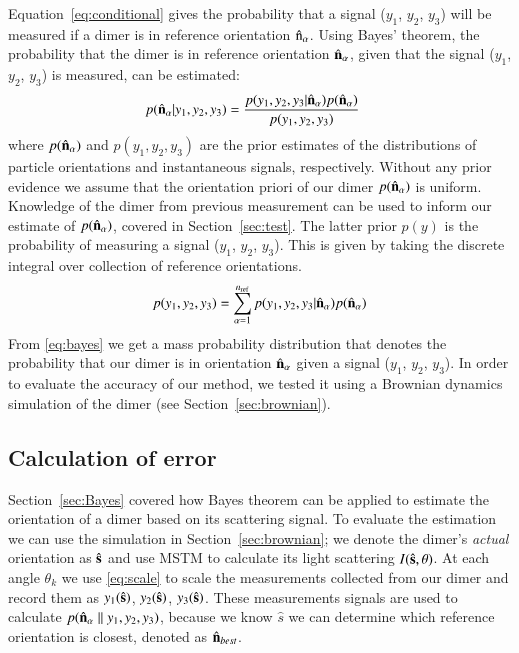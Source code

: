 \documentclass[final, 3p]{elsarticle}
\begin{document}
Equation~\eqref{eq:conditional} gives the probability that a signal
($y_1$, $y_2$, $y_3$) will be measured if a dimer is in reference
orientation $\hat{\rm n}_\alpha$.
Using Bayes' theorem, the probability that the dimer is in reference orientation $\hat{\bf n}_\alpha$, given that the signal ($y_1$, $y_2$,
$y_3$) is measured, can be estimated:
\begin{align}
  \label{eq:bayes}
  p(\hat{\bf n}_\alpha| y_1,y_2,y_3)
  &=
    \frac{p(y_1,y_2,y_3|\hat{\bf n}_\alpha)
    p(\hat{\bf n}_\alpha)}{p(y_1, y_2, y_3)}
\end{align}
where $p(\hat{\bf n}_\alpha)$ and $p(y_1, y_2, y_3)$ are the prior
estimates of the distributions of particle orientations and
instantaneous signals, respectively.
%
Without any prior evidence we assume that the orientation priori of our dimer
$p(\hat{\bf n}_{\alpha})$ is uniform. Knowledge of the dimer from previous
measurement can be used to inform our estimate of $p(\hat{\bf n}_{\alpha})$, covered in Section~\ref{sec:test}.  The latter prior $p(y)$ is the probability of measuring a signal ($y_1$, $y_2$, $y_3$).  This is given by taking the discrete integral over collection of reference orientations.
\begin{align}
  p(y_1, y_2, y_3)
  =
  \sum_{\alpha=1}^{n_{\rm ref}}
  p(y_1, y_2, y_3|\hat{\bf n}_\alpha)
  p(\hat{\bf n}_\alpha)
\end{align}
From \eqref{eq:bayes} we get a mass probability distribution that denotes the
probability that our dimer is in orientation $\hat{\bf n}_{\alpha}$ given a
signal ($y_1$, $y_2$, $y_3$). In order to evaluate the accuracy of our method, we tested it using a Brownian dynamics simulation of the dimer (see Section~\ref{sec:brownian}).

\subsection{Calculation of error}
\label{sec:divergence}
Section~\ref{sec:Bayes} covered how Bayes theorem can be applied to estimate
the orientation of a dimer based on its scattering signal. To evaluate the estimation we can use the simulation in Section~\ref{sec:brownian}; we denote the dimer's \emph{actual} orientation as $\hat{\bf s}$ and use MSTM to calculate its light scattering $I(\hat{\bf s}, \theta)$. At each angle $\theta_k$ we use \eqref{eq:scale} to scale the measurements collected from our dimer and record them as $y_1(\hat{\bf s})$, $y_2(\hat{\bf s})$, $y_3(\hat{\bf s})$. These measurements signals are used to calculate $p(\hat{\bf n}_{\alpha}\parallel y_1, y_2, y_3)$, because we know $\hat{s}$ we can determine which reference orientation is closest, denoted as $\hat{\bf n}_{best}$.
\end{document}
